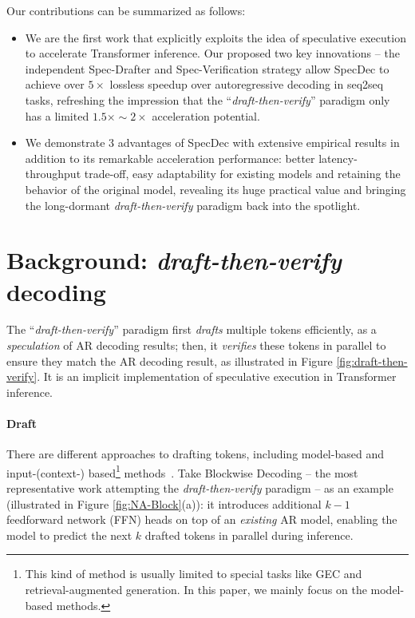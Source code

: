 Our contributions can be summarized as follows:

\begin{itemize}
    \item We are the first work that explicitly exploits the idea of speculative execution to accelerate Transformer inference. Our proposed two key innovations -- the independent Spec-Drafter and Spec-Verification strategy allow SpecDec to achieve over $5\times$ lossless speedup over autoregressive decoding in seq2seq tasks, refreshing the impression that the ``\textit{draft-then-verify}'' paradigm only has a limited $1.5\times \sim 2\times$ acceleration potential.
    \item We demonstrate 3 advantages of SpecDec with extensive empirical results in addition to its remarkable acceleration performance: better latency-throughput trade-off, easy adaptability for existing models and retaining the behavior of the original model, revealing its huge practical value and bringing the long-dormant \textit{draft-then-verify} paradigm back into the spotlight.
\end{itemize}

\section{Background: \textit{draft-then-verify} decoding}
\label{sec:Background}

The ``\textit{draft-then-verify}'' paradigm first \textit{drafts} multiple tokens efficiently, as a \textit{speculation} of AR decoding results; then, it \textit{verifies} these tokens in parallel to ensure they match the AR decoding result, as illustrated in Figure \ref{fig:draft-then-verify}. It is an implicit implementation of speculative execution in Transformer inference.

\paragraph{Draft} There are different approaches to drafting tokens, including model-based \cite{Stern:2018blockwise} and input-(context-) based\footnote{This kind of method is usually limited to special tasks like GEC and retrieval-augmented generation. In this paper, we mainly focus on the model-based methods.} methods~\cite{Sun:2020SAD,yang2023inference}. Take Blockwise Decoding -- the most representative work attempting the \textit{draft-then-verify} paradigm -- as an example (illustrated in Figure \ref{fig:NA-Block}(a)): it introduces additional $k-1$ feedforward network (FFN) heads on top of an \textit{existing} AR model, enabling the model to predict the next $k$ drafted tokens in parallel during inference.

